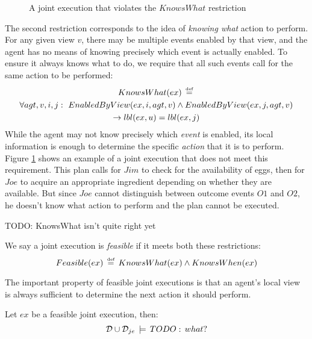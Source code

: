 %
\begin{figure}[!b]

\caption{A joint execution that violates the $KnowsWhat$ restriction}


\label{fig:not-knows-what} 
\end{figure}


The second restriction corresponds to the idea of \emph{knowing what}
action to perform. For any given view $v$, there may be multiple
events enabled by that view, and the agent has no means of knowing
precisely which event is actually enabled. To ensure it always knows
what to do, we require that all such events call for the same action
to be performed:\begin{multline*}
KnowsWhat(ex)\,\stackrel{\mbox{\tiny def}}{=}\,\\
\forall agt,v,i,j:\,\, EnabledByView(ex,i,agt,v)\wedge EnabledByView(ex,j,agt,v)\\
\rightarrow lbl(ex,u)=lbl(ex,j)\end{multline*}
 While the agent may not know precisely which \emph{event} is enabled,
its local information is enough to determine the specific \emph{action}
that it is to perform. Figure \ref{fig:not-knows-what} shows an example
of a joint execution that does not meet this requirement. This plan
calls for $Jim$ to check for the availability of eggs, then for $Joe$
to acquire an appropriate ingredient depending on whether they are
available. But since $Joe$ cannot distinguish between outcome events
$O1$ and $O2$, he doesn't know what action to perform and the plan
cannot be executed.

TODO: KnowsWhat isn't quite right yet

We say a joint execution is \emph{feasible} if it meets both these
restrictions:\[
Feasible(ex)\,\stackrel{\mbox{\tiny def}}{=}\, KnowsWhat(ex)\wedge KnowsWhen(ex)\]


The important property of feasible joint executions is that an agent's
local view is always sufficient to determine the next action it should
perform.

\begin{thm}
Let $ex$ be a feasible joint execution, then:\[
\mathcal{D}\cup\mathcal{D}_{je}\,\models\, TODO:\, what?\]

\end{thm}

